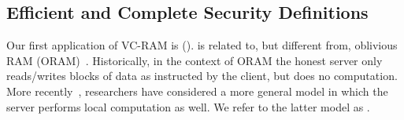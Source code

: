 
\subsection{Efficient \namebig and Complete Security Definitions}
Our first application of VC-RAM is 
\name (\nameshort). 
\nameshort is related to, but different
from, oblivious RAM (ORAM)~\cite{oram00}.
Historically, in the context of ORAM the honest server only reads/writes blocks of data as instructed
by the client, but does no computation.
More recently~\cite{LO12,oram13}, researchers have considered a more general model
in which the server performs local computation as well. We refer to 
the latter model as \name.


